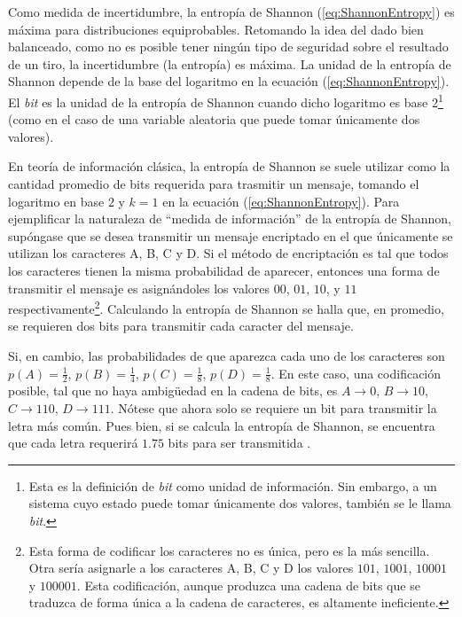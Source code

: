 Como medida de incertidumbre, la entropía de Shannon (\ref{eq:ShannonEntropy}) es máxima para distribuciones equiprobables. Retomando la idea del dado bien balanceado, como no es posible tener ningún tipo de seguridad sobre el resultado de un tiro, la incertidumbre (la entropía) es máxima. La unidad de la entropía de Shannon depende de la base del logaritmo en la ecuación (\ref{eq:ShannonEntropy}). El \textit{bit} es la unidad de la entropía de Shannon cuando dicho logaritmo es base $2$\footnote{Esta es la definición de \textit{bit} como unidad de información. Sin embargo, a un sistema cuyo estado puede tomar únicamente dos valores, también se le llama \textit{bit}.} (como en el caso de una variable aleatoria que puede tomar únicamente dos valores).


En teoría de información clásica, la entropía de Shannon se suele utilizar como la cantidad promedio de bits requerida para trasmitir un mensaje, tomando el logaritmo en base $2$ y $k=1$ en la ecuación (\ref{eq:ShannonEntropy}). Para ejemplificar la naturaleza de ``medida de información'' de la entropía de Shannon, supóngase que se desea transmitir un mensaje encriptado en el que únicamente se utilizan los caracteres A, B, C y D. Si el método de encriptación es tal que todos los caracteres tienen la misma probabilidad de aparecer, entonces una forma de transmitir el mensaje es asignándoles los valores $00$, $01$, $10$, y $11$ respectivamente\footnote{Esta forma de codificar los caracteres no es única, pero es la más sencilla. Otra sería asignarle a los caracteres A, B, C y D los valores $101$, $1001$, $10001$ y $100001$. Esta codificación, aunque produzca una cadena de bits que se traduzca de forma única a la cadena de caracteres, es altamente ineficiente. }. Calculando la entropía de Shannon se halla que, en promedio, se requieren dos bits para transmitir cada caracter del mensaje. 

Si, en cambio, las probabilidades de que aparezca cada uno de los caracteres son $p(A)=\frac{1}{2}$, $p(B)=\frac{1}{4}$, $p(C)=\frac{1}{8}$, $p(D)=\frac{1}{8}$. En este caso, una codificación posible, tal que no haya ambigüedad en la cadena de bits, es $A \rightarrow 0$, $B\rightarrow 10$, $C\rightarrow 110$, $D\rightarrow 111$. Nótese que ahora solo se requiere un bit para transmitir la letra más común. Pues bien, si se calcula la entropía de Shannon, se encuentra que cada letra requerirá $1.75$ bits para ser transmitida \cite{Cryptography}.

